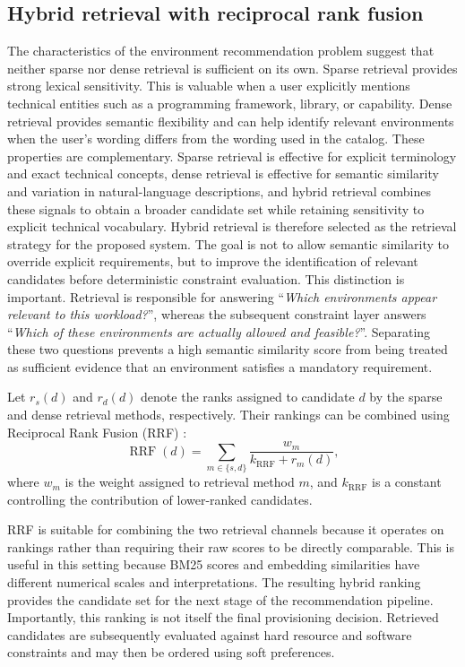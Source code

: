 \subsection{Hybrid retrieval with reciprocal rank fusion}\label{subsec:rrf_theory}

The characteristics of the environment recommendation problem suggest that neither sparse nor dense retrieval is sufficient on its own. Sparse retrieval provides strong lexical sensitivity. This is valuable when a user explicitly mentions technical entities such as a programming framework, library, or capability. Dense retrieval provides semantic flexibility and can help identify relevant environments when the user's wording differs from the wording used in the catalog. These properties are complementary. Sparse retrieval is effective for explicit terminology and exact technical concepts, dense retrieval is effective for semantic similarity and variation in natural-language descriptions, and hybrid retrieval combines these signals to obtain a broader candidate set while retaining sensitivity to explicit technical vocabulary. Hybrid retrieval is therefore selected as the retrieval strategy for the proposed system. The goal is not to allow semantic similarity to override explicit requirements, but to improve the identification of relevant candidates before deterministic constraint evaluation. This distinction is important. Retrieval is responsible for answering ``\emph{Which environments appear relevant to this workload?}'', whereas the subsequent constraint layer answers ``\emph{Which of these environments are actually allowed and feasible?}''. Separating these two questions prevents a high semantic similarity score from being treated as sufficient evidence that an environment satisfies a mandatory requirement.

Let \(r_s(d)\) and \(r_d(d)\) denote the ranks assigned to candidate \(d\) by the sparse and dense retrieval methods, respectively. Their rankings can be combined using Reciprocal Rank Fusion (RRF) \cite{rrf}:
\[
    \operatorname{RRF}(d)
    =
    \sum_{m\in\{s,d\}}
    \frac{w_m}{k_{\mathrm{RRF}}+r_m(d)},
\]
where \(w_m\) is the weight assigned to retrieval method \(m\), and \(k_{\mathrm{RRF}}\) is a constant controlling the contribution of lower-ranked candidates.

RRF is suitable for combining the two retrieval channels because it operates on rankings rather than requiring their raw scores to be directly comparable. This is useful in this setting because BM25 scores and embedding similarities have different numerical scales and interpretations. The resulting hybrid ranking provides the candidate set for the next stage of the recommendation pipeline. Importantly, this ranking is not itself the final provisioning decision. Retrieved candidates are subsequently evaluated against hard resource and software constraints and may then be ordered using soft preferences.

